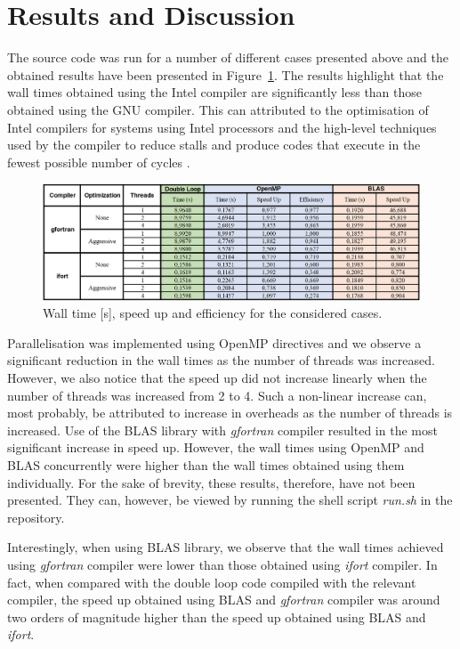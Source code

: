 \documentclass[11pt, oneside]{article}   	%
\begin{document}
\section{Results and Discussion}
The source code was run for a number of different cases presented above and the obtained results have been presented in Figure~\ref{results}. The results highlight that the wall times obtained using the Intel compiler are significantly less than those obtained using the  GNU compiler. This can attributed to the optimisation of Intel compilers for systems using Intel processors and the high-level techniques used by the compiler to reduce stalls and produce codes that execute in the fewest possible number of cycles \cite{Corporation:2018aa}. 
	\begin{figure}[h]
		\centering
		\includegraphics[width=\textwidth]{Results}
		\caption{Wall time [s], speed up and efficiency for the considered cases.}
		\label{results}
	\end{figure} 
Parallelisation was implemented using OpenMP directives and we observe a significant reduction in the wall times as the number of threads was increased. However, we also notice that the speed up did not increase linearly when the number of threads was increased from 2 to 4. Such a non-linear increase can, most probably, be attributed to increase in overheads as the number of threads is increased. Use of the BLAS library with \textit{gfortran} compiler resulted in the most significant increase in speed up. However, the wall times using OpenMP and BLAS concurrently were higher than the wall times obtained using them individually. For the sake of brevity, these results, therefore, have not been presented. They can, however, be viewed by running the shell script \textit{run.sh} in the repository.

Interestingly, when using BLAS library, we observe that the wall times achieved using \textit{gfortran} compiler were lower than those obtained using \textit{ifort} compiler. In fact, when compared with the double loop code compiled with the relevant compiler, the speed up obtained using BLAS and \textit{gfortran} compiler was around two orders of magnitude higher than the speed up obtained using BLAS and \textit{ifort}. 
\end{document}
